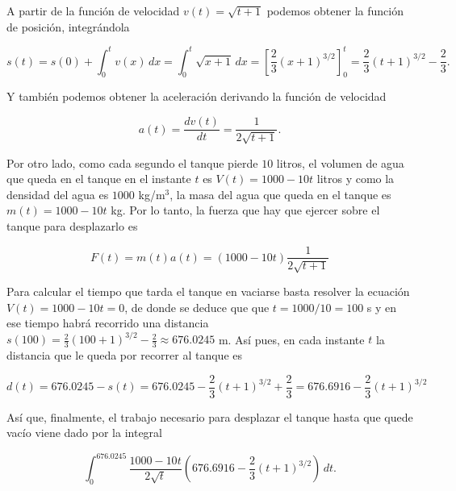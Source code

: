 \documentclass[
  spanish,
  a4paper,
]{scrreport}
\theoremstyle{definition}
\theoremstyle{remark}
\begin{document}
\begin{tcolorbox}[enhanced jigsaw, colbacktitle=quarto-callout-tip-color!10!white, opacityback=0, toptitle=1mm, title=\textcolor{quarto-callout-tip-color}{\faLightbulb}\hspace{0.5em}{Solución}, coltitle=black, opacitybacktitle=0.6, breakable, toprule=.15mm, leftrule=.75mm, titlerule=0mm, colframe=quarto-callout-tip-color-frame, left=2mm, bottomrule=.15mm, bottomtitle=1mm, arc=.35mm, rightrule=.15mm, colback=white]

A partir de la función de velocidad \(v(t) = \sqrt{t+1}\) podemos
obtener la función de posición, integrándola

\[
s(t) 
= s(0) + \int_0^t v(x)\,dx
= \int_0^t \sqrt{x+1}\,dx
= \left[\frac{2}{3}(x+1)^{3/2}\right]_0^t
= \frac{2}{3}(t+1)^{3/2} - \frac{2}{3}.
\]

Y también podemos obtener la aceleración derivando la función de
velocidad

\[
a(t)
= \frac{dv(t)}{dt}
= \frac{1}{2\sqrt{t+1}}.
\]

Por otro lado, como cada segundo el tanque pierde \(10\) litros, el
volumen de agua que queda en el tanque en el instante \(t\) es
\(V(t) = 1000 - 10t\) litros y como la densidad del agua es \(1000\)
kg/m\(^3\), la masa del agua que queda en el tanque es
\(m(t) = 1000 - 10t\) kg. Por lo tanto, la fuerza que hay que ejercer
sobre el tanque para desplazarlo es

\[
F(t) = m(t)a(t) = (1000 - 10t)\frac{1}{2\sqrt{t+1}}
\]

Para calcular el tiempo que tarda el tanque en vaciarse basta resolver
la ecuación \(V(t)=1000-10t = 0\), de donde se deduce que que
\(t=1000/10=100\) s y en ese tiempo habrá recorrido una distancia
\(s(100) = \frac{2}{3}(100+1)^{3/2} - \frac{2}{3} \approx 676.0245\) m.
Así pues, en cada instante \(t\) la distancia que le queda por recorrer
al tanque es

\[
d(t) 
= 676.0245 - s(t)
= 676.0245 - \frac{2}{3}(t+1)^{3/2} + \frac{2}{3}
= 676.6916 - \frac{2}{3}(t+1)^{3/2}
\]

Así que, finalmente, el trabajo necesario para desplazar el tanque hasta
que quede vacío viene dado por la integral

\[
\int_0^{676.0245} \frac{1000-10t}{2\sqrt{t}} (676.6916 - \frac{2}{3}(t+1)^{3/2})\,dt.
\]

\end{tcolorbox}

\end{document}
